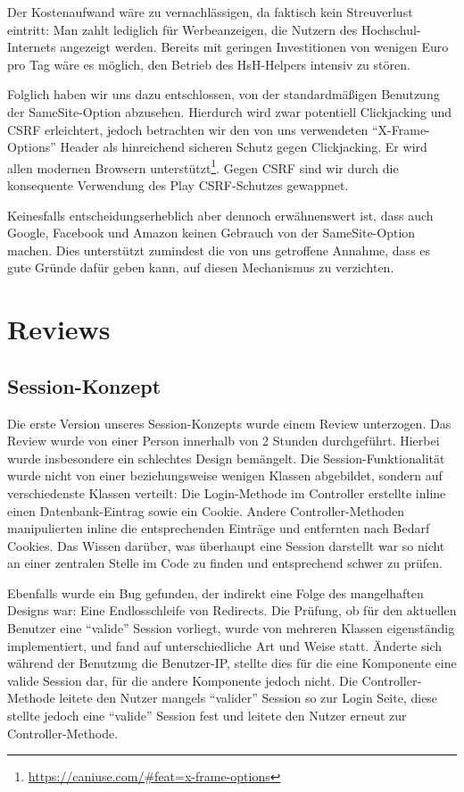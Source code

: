 \documentclass[12pt,DIV14,BCOR10mm,a4paper,parskip=half-,headsepline,headinclude,english,ngerman,bibliography=totocnumbered]{scrreprt}
\begin{document}
Der Kostenaufwand wäre zu vernachlässigen, da faktisch kein Streuverlust eintritt: Man zahlt lediglich für Werbeanzeigen, die Nutzern des Hochschul-Internets angezeigt werden. Bereits mit geringen Investitionen von wenigen Euro pro Tag wäre es möglich, den Betrieb des HsH-Helpers intensiv zu stören.

Folglich haben wir uns dazu entschlossen, von der standardmäßigen Benutzung der SameSite-Option abzusehen. Hierdurch wird zwar potentiell Clickjacking und CSRF erleichtert, jedoch betrachten wir den von uns verwendeten \enquote{X-Frame-Options} Header als hinreichend sicheren Schutz gegen Clickjacking. Er wird allen modernen Browsern unterstützt\footnote{\url{https://caniuse.com/\#feat=x-frame-options}}. Gegen CSRF sind wir durch die konsequente Verwendung des Play CSRF-Schutzes gewappnet.

Keinesfalls entscheidungserheblich aber dennoch erwähnenswert ist, dass auch Google, Facebook und Amazon keinen Gebrauch von der SameSite-Option machen. Dies unterstützt zumindest die von uns getroffene Annahme, dass es gute Gründe dafür geben kann, auf diesen Mechanismus zu verzichten.


\section{Reviews}
\subsection{Session-Konzept}
Die erste Version unseres Session-Konzepts wurde einem Review unterzogen. Das Review wurde von einer Person innerhalb von 2 Stunden durchgeführt. Hierbei wurde insbesondere ein schlechtes Design bemängelt. Die Session-Funktionalität wurde nicht von einer beziehungsweise wenigen Klassen abgebildet, sondern auf verschiedenste Klassen verteilt: Die Login-Methode im Controller erstellte inline einen Datenbank-Eintrag sowie ein Cookie. Andere Controller-Methoden manipulierten inline die entsprechenden Einträge und entfernten nach Bedarf Cookies. Das Wissen darüber, was überhaupt eine Session darstellt war so nicht an einer zentralen Stelle im Code zu finden und entsprechend schwer zu prüfen.

Ebenfalls wurde ein Bug gefunden, der indirekt eine Folge des mangelhaften Designs war: Eine Endlosschleife von Redirects. Die Prüfung, ob für den aktuellen Benutzer eine \enquote{valide} Session vorliegt, wurde von mehreren Klassen eigenständig implementiert, und fand auf unterschiedliche Art und Weise statt. Änderte sich während der Benutzung die Benutzer-IP, stellte dies für die eine Komponente eine valide Session dar, für die andere Komponente jedoch nicht. Die Controller-Methode leitete den Nutzer mangels \enquote{valider} Session so zur Login Seite, diese stellte jedoch eine \enquote{valide} Session fest und leitete den Nutzer erneut zur Controller-Methode.
\end{document}
